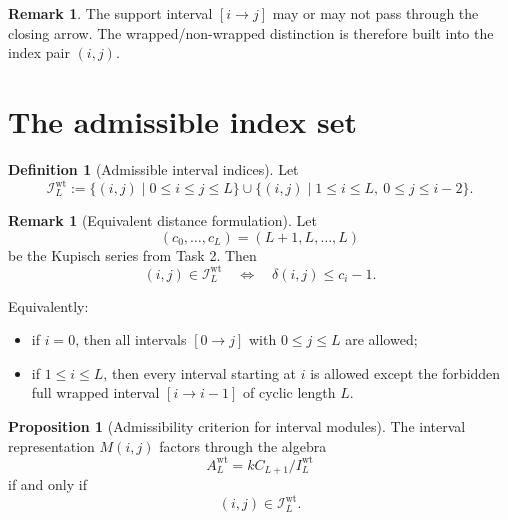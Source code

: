 \documentclass{article}
\theoremstyle{definition}
\newtheorem{proposition}[theorem]{Proposition}
\newtheorem{definition}[theorem]{Definition}
\newtheorem{remark}[theorem]{Remark}
\begin{document}
\begin{remark}
The support interval $[i\to j]$ may or may not pass through the closing arrow.
The wrapped/non-wrapped distinction is therefore built into the index pair
$(i,j)$.
\end{remark}

\section{The admissible index set}

\begin{definition}[Admissible interval indices]
Let
\[
\mathcal I_L^{\mathrm{wt}}
:=
\{(i,j)\mid 0\le i\le j\le L\}
\cup
\{(i,j)\mid 1\le i\le L,\ 0\le j\le i-2\}.
\]
\end{definition}

\begin{remark}[Equivalent distance formulation]
Let
\[
(c_0,\dots,c_L)=(L+1,L,\dots,L)
\]
be the Kupisch series from Task 2.
Then
\[
(i,j)\in \mathcal I_L^{\mathrm{wt}}
\quad\Longleftrightarrow\quad
\delta(i,j)\le c_i-1.
\]

Equivalently:

\begin{itemize}
\item if $i=0$, then all intervals $[0\to j]$ with $0\le j\le L$ are allowed;
\item if $1\le i\le L$, then every interval starting at $i$ is allowed except
  the forbidden full wrapped interval $[i\to i-1]$ of cyclic length $L$.
\end{itemize}
\end{remark}

\begin{proposition}[Admissibility criterion for interval modules]
The interval representation $M(i,j)$ factors through the algebra
\[
A_L^{\mathrm{wt}}=kC_{L+1}/I_L^{\mathrm{wt}}
\]
if and only if
\[
(i,j)\in \mathcal I_L^{\mathrm{wt}}.
\]
\end{proposition}
\end{document}
